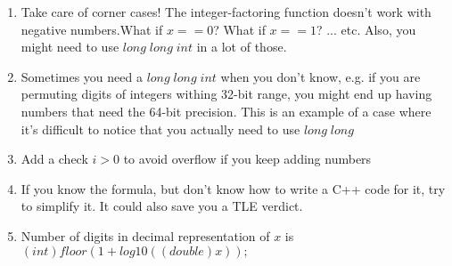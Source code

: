 \documentclass[12pt]{book}
\begin{document}
\begin{enumerate}[label = \roman*.]
\item
Take care of corner cases! The integer-factoring function doesn't work with negative numbers.What if $x == 0$? What if $x == 1$? ... etc. Also, you might need to use $long\;long\;int$ in a lot of those.

\item
Sometimes you need a $long\;long\;int$ when you don't know, e.g. if you are permuting digits of integers withing 32-bit range, you might end up having numbers that need the 64-bit precision. This is an example of a case where it's difficult to notice that you actually need to use $long\;long$

\item
Add a check $i > 0$ to avoid overflow if you keep adding numbers

\item
If you know the formula, but don't know how to write a C++ code for it, try to simplify it. It could also save you a TLE verdict.

\item
Number of digits in decimal representation of $x$ is $(int)floor(1 + log10((double) x));$
\end{enumerate}
\end{document}
